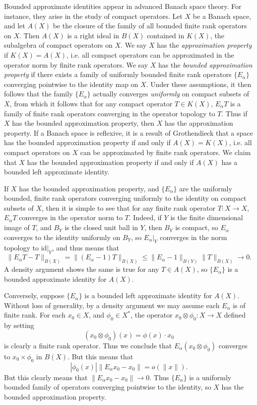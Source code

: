\begin{example}
    Bounded approximate identities appear in advanced Banach space theory. For instance, they arise in the study of compact operators. Let $X$ be a Banach space, and let $A(X)$ be the closure of the family of all bounded finite rank operators on $X$. Then $A(X)$ is a right ideal in $B(X)$ contained in $K(X)$, the subalgebra of compact operators on $X$. We say $X$ has the \emph{approximation property} if $K(X) = A(X)$, i.e. all compact operators can be approximated in the operator norm by finite rank operators. We say $X$ has the \emph{bounded approximation property} if there exists a family of uniformly bounded finite rank operators $\{ E_\alpha \}$ converging pointwise to the identity map on $X$. Under these assumptions, it then follows that the family $\{ E_\alpha \}$ actually converges \emph{uniformly} on compact subsets of $X$, from which it follows that for any compact operator $T \in K(X)$, $E_\alpha T$ is a family of finite rank operators converging in the operator topology to $T$. Thus if $X$ has the bounded approximation property, then $X$ has the approximation property. If a Banach space is reflexive, it is a result of Grothendieck that a space has the bounded approximation property if and only if $A(X) = K(X)$, i.e. all compact operators on $X$ can be approximated by finite rank operators. We claim that $X$ has the bounded approximation property if and only if $A(X)$ has a bounded left approximate identity.

    If $X$ has the bounded approximation property, and $\{ E_\alpha \}$ are the uniformly bounded, finite rank operators converging uniformly to the identity on compact subsets of $X$, then it is simple to see that for any finite rank operator $T: X \to X$, $E_\alpha T$ converges in the operator norm to $T$. Indeed, if $Y$ is the finite dimensional image of $T$, and $B_Y$ is the closed unit ball in $Y$, then $B_Y$ is compact, so $E_\alpha$ converges to the identity uniformly on $B_Y$, so $E_\alpha|_Y$ converges in the norm topology to $\text{id}|_Y$, and thus means that
    \[ \| E_\alpha T - T \|_{B(X)} = \| (E_\alpha - 1) T \|_{B(X)} \leq \| E_\alpha - 1 \|_{B(Y)} \| T \|_{B(X)} \to 0. \]
    A density argument shows the same is true for any $T \in A(X)$, so $\{ E_\alpha \}$ is a bounded approximate identity for $A(X)$.

    Conversely, suppose $\{ E_\alpha \}$ is a bounded left approximate identity for $A(X)$. Without loss of generality, by a density argument we may assume each $E_\alpha$ is of finite rank. For each $x_0 \in X$, and $\phi_0 \in X^*$, the operator $x_0 \otimes \phi_0: X \to X$ defined by setting
    \[ (x_0 \otimes \phi_0)(x) = \phi(x) \cdot x_0 \]
    is clearly a finite rank operator. Thus we conclude that $E_\alpha (x_0 \otimes \phi_0)$ converges to $x_0 \times \phi_0$ in $B(X)$. But this means that
    \[ |\phi_0(x)| \| E_\alpha x_0 - x_0 \| = o \left( \| x \| \right). \]
    But this clearly means that $\| E_\alpha x_0 - x_0 \| \to 0$. Thus $\{ E_\alpha \}$ is a uniformly bounded family of operators converging pointwise to the identity, so $X$ has the bounded approximation property.


\end{example}
